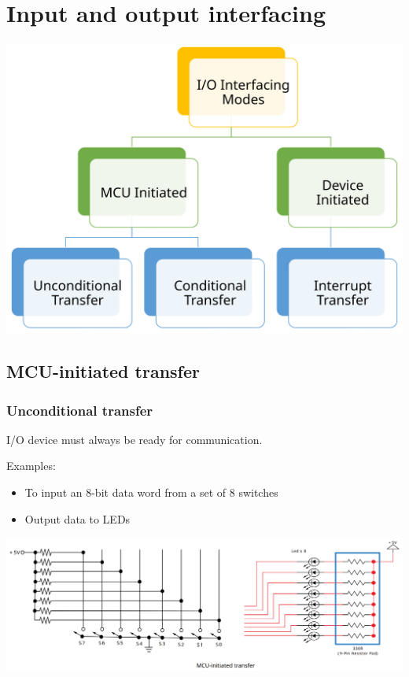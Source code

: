 \documentclass[11pt]{article}
\begin{document}
 \newpage

\section{Input and output interfacing}
\label{sec:org809678c}
\begin{center}
\includegraphics[width=.9\linewidth]{./images/input-and-output-interfacing-diagram.png}
\end{center}

\subsection{MCU-initiated transfer}
\label{sec:orgfe91ed0}

\subsubsection{Unconditional transfer}
\label{sec:org7f60ccc}
I/O device must always be ready for communication.

Examples:
\begin{itemize}
\item To input an 8-bit data word from a set of 8 switches
\item Output data to LEDs
\end{itemize}

\begin{center}
\includegraphics[width=.9\linewidth]{./images/unconditional-transfer-diagram.png}
\end{center}
\end{document}
